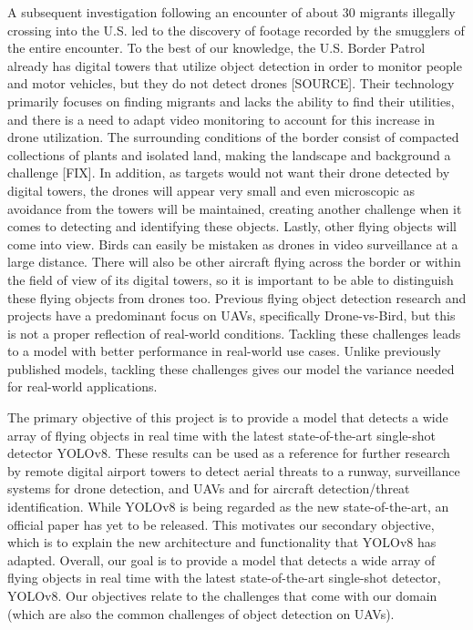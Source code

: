 \documentclass[10pt,twocolumn,letterpaper]{article}
\begin{document}
A subsequent investigation following  an encounter of about 30 migrants illegally crossing into the U.S. led to the discovery of footage recorded by the smugglers of the entire encounter. To the best of our knowledge, the U.S. Border Patrol already has digital towers that utilize object detection in order to monitor people and motor vehicles, but they do not detect drones [SOURCE]. Their technology primarily focuses on finding migrants and lacks the ability to find their utilities, and there is a need to adapt video monitoring to account for this increase in drone utilization. The surrounding conditions of the border consist of compacted collections of plants and isolated land, making the landscape and background a challenge [FIX]. In addition, as targets would not want their drone detected by digital towers, the drones will appear very small and even microscopic as avoidance from the towers will be maintained, creating another challenge when it comes to detecting and identifying these objects. Lastly, other flying objects will come into view. Birds can easily be mistaken as drones in video surveillance at a large distance. There will also be other aircraft flying across the border or within the field of view of its digital towers, so it is important to be able to distinguish these flying objects from drones too. Previous flying object detection research and projects have a predominant focus on UAVs, specifically Drone-vs-Bird, but this is not a proper reflection of real-world conditions. Tackling these challenges leads to a model with better performance in real-world use cases. Unlike previously published models, tackling these challenges gives our model the variance needed for real-world applications.

The primary objective of this project is to provide a model that detects a wide array of flying objects in real time with the latest state-of-the-art single-shot detector YOLOv8. These results can be used as a reference for further research by remote digital airport towers to detect aerial threats to a runway, surveillance systems for drone detection, and UAVs and for aircraft detection/threat identification. While YOLOv8 is being regarded as the new state-of-the-art, an official paper has yet to be released. This motivates our secondary objective, which is to explain the new architecture and functionality that YOLOv8 has adapted. Overall, our goal is to provide a model that detects a wide array of flying objects in real time with the latest state-of-the-art single-shot detector, YOLOv8. Our objectives relate to the challenges that come with our domain (which are also the common challenges of object detection on UAVs).
\end{document}

